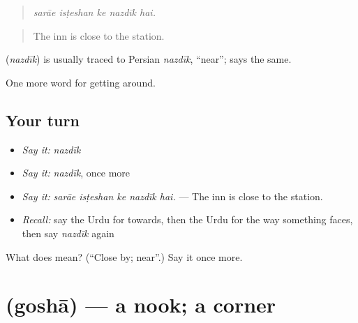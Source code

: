 \begin{quote}
    
\end{quote}

\begin{quote}
\emph{sarāe isṭeshan ke nazdīk hai.}
\end{quote}

\begin{quote}
The inn is close to the station.
\end{quote}

\begin{cousinweb}
\textbf{} (\emph{nazdīk}) is usually traced to Persian \emph{nazdīk}, \textquotedblleft{}near\textquotedblright{}; \textbf{} says the same.
\end{cousinweb}

\begin{grammarlens}[title={What you've built}]
One more word for getting around.
\end{grammarlens}

\subsection*{Your turn}
\begin{itemize}
\raggedright
  \item \emph{Say it:} \emph{nazdīk}
  \item \emph{Say it:} \emph{nazdīk}, once more
  \item \emph{Say it:} \emph{sarāe isṭeshan ke nazdīk hai.} — The inn is close to the station.
  \item \emph{Recall:} say the Urdu for towards, then the Urdu for the way something faces, then say \emph{nazdīk} again
\end{itemize}

\begin{tcolorbox}[breakable,colback=teal!4,colframe=teal!35!black,title={Before you move on}]
What does  mean? (\textquotedblleft{}Close by; near\textquotedblright{}.) Say it once more.
\end{tcolorbox}
\section[\texorpdfstring{\ur{گوشہ} (goshā)}{گوشہ (goshā)}]{ (goshā) — a nook; a corner}

\label{lesson:UR-C409-gosha}



